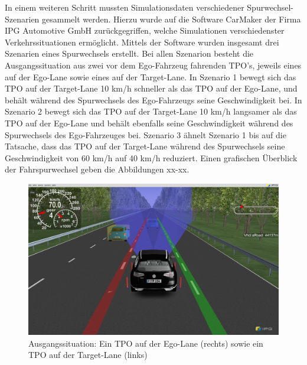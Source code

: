 
In einem weiteren Schritt mussten Simulationsdaten verschiedener Spurwechsel-Szenarien gesammelt werden. Hierzu wurde auf die Software \glqq CarMaker\grqq{} der Firma IPG Automotive GmbH zurückgegriffen, welche Simulationen verschiedenster Verkehrssituationen ermöglicht. Mittels der Software wurden insgesamt drei Szenarien eines Spurwechsels erstellt. Bei allen Szenarion besteht die Ausgangssituation aus zwei vor dem Ego-Fahrzeug fahrenden TPO's, jeweils eines auf der Ego-Lane sowie eines auf der Target-Lane. In \glqq Szenario 1\grqq{} bewegt sich das TPO auf der Target-Lane 10 km/h schneller als das TPO auf der Ego-Lane, und behält während des Spurwechsels des Ego-Fahrzeugs seine Geschwindigkeit bei. In \glqq Szenario 2\grqq{} bewegt sich das TPO auf der Target-Lane 10 km/h langsamer als das TPO auf der Ego-Lane und behält ebenfalls seine Geschwindigkeit während des Spurwechsels des Ego-Fahrzeuges bei. \glqq Szenario 3\grqq{} ähnelt \glqq Szenario 1\grqq{} bis auf die Tatsache, dass das TPO auf der Target-Lane während des Spurwechsels seine Geschwindigkeit von 60 km/h auf 40 km/h reduziert. Einen grafischen Überblick der Fahrspurwechsel geben die Abbildungen xx-xx.

\begin{figure}[!ht]
	\begin{center}
		\includegraphics[width=1.0\linewidth]{Abbildungen/bericht/carmaker_lc_part1}
		\caption{Ausgangssituation: Ein TPO auf der Ego-Lane (rechts) sowie ein TPO auf der Target-Lane (links) }
		\label{fig.carmaker_lanechange_part1}
	\end{center}
\end{figure} 

